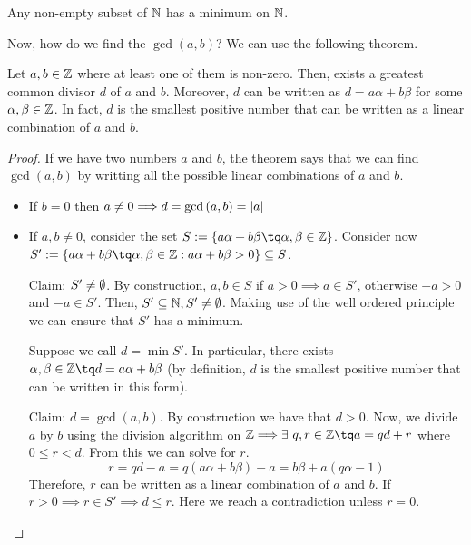 \begin{theorem}
    Any non-empty subset of $\mathbb{N}$ has a minimum on $\mathbb{N}$.
\end{theorem}

Now, how do we find the $\gcd\left( a, b \right) $? We can use the following theorem.

\begin{theorem}
    Let $a, b\in\mathbb{Z}$ where at least one of them is non-zero. Then, exists a greatest common divisor $d$
    of $a$ and $b$. Moreover, $d$ can be written as $d = a\alpha + b\beta$ for some $\alpha, \beta\in\mathbb{Z}$.
    In fact, $d$ is the smallest positive number that can be written as a linear combination of $a$ and $b$.
\end{theorem}

\begin{proof}
    If we have two numbers $a$ and $b$, the theorem says that we can find $\gcd\left( a, b \right) $ by
    writting all the possible linear combinations of $a$ and $b$.
    \begin{itemize}
        \item If $b = 0$ then $a\neq 0\Longrightarrow d = \gcd\left( a, b \right) = \left\vert a \right\vert$
        \item If $a, b\neq 0$, consider the set $S:= \{a\alpha + b\beta\tq\alpha, \beta\in\Z\} $. Consider
            now $S':=\{a\alpha + b\beta\tq\alpha, \beta\in\Z: a\alpha + b\beta > 0\}\subseteq S$.

            Claim: $S'\neq\emptyset$. By construction, $a, b\in S$ if $a > 0\implies a\in S'$, otherwise $-a > 0$
            and $-a\in S'$. Then, $S'\subseteq\mathbb{N}, S'\neq\emptyset$. Making use of the well ordered principle we
            can ensure that $S'$ has a minimum.

            Suppose we call $d = \min S'$. In particular, there exists $\alpha, \beta\in\Z\tq d = a\alpha
            + b\beta$ (by definition, $d$ is the smallest positive number that can be written in this form).

            Claim: $d = \gcd\left( a, b \right) $. By construction we have that $d > 0$. Now, we divide
            $a$ by $b$ using the division algorithm on $\Z\implies\exists\ q, r\in\Z\tq a = qd + r$ where
            $0\leq r < d$. From this we can solve for $r$.
            \begin{equation}
                r = qd - a = q\left( a\alpha + b\beta \right) - a = b\beta + a\left( q\alpha - 1 \right)
            \end{equation}
            Therefore, $r$ can be written as a linear combination of $a$ and $b$. If $r > 0\implies r\in S'
            \implies d\leq r$. Here we reach a contradiction unless $r = 0$.


\end{itemize}
\end{proof}
